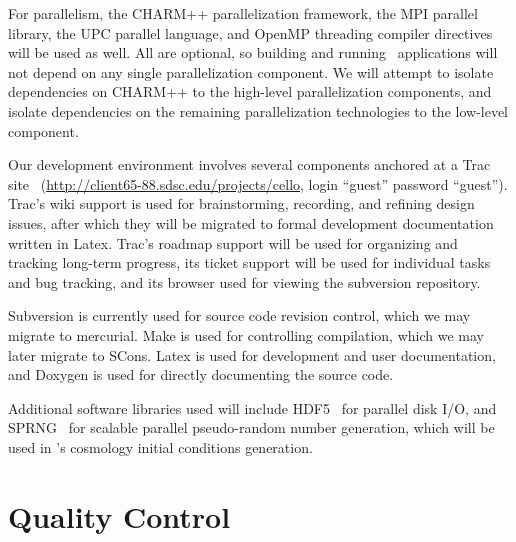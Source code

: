 \documentclass[10pt]{article}
\begin{document}
For parallelism, the CHARM++ parallelization framework, the MPI
parallel library, the UPC parallel language, and OpenMP threading
compiler directives will be used as well.  All are optional, so
building and running \cello\ applications will not depend on any
single parallelization component.  We will attempt to isolate
dependencies on CHARM++ to the high-level parallelization components,
and isolate dependencies on the remaining parallelization technologies
to the low-level  component.

Our development environment involves several components anchored at a
Trac site~\cite{wwwtrac}
(\url{http://client65-88.sdsc.edu/projects/cello}, login ``guest''
password ``guest'').  Trac's wiki support is used for brainstorming,
recording, and refining design issues, after which they will be
migrated to formal development documentation written in Latex.  Trac's
roadmap support will be used for organizing and tracking long-term
progress, its ticket support will be used for individual tasks and bug
tracking, and its browser used for viewing the subversion repository.

Subversion is currently used for source code revision control, which
we may migrate to mercurial.  Make is used for controlling
compilation, which we may later migrate to SCons.  Latex is used for
development and user documentation, and Doxygen is used for directly
documenting the source code.

Additional software libraries used will include HDF5~\cite{hdf5} for
parallel disk I/O, and SPRNG~\cite{wwwsprng} for scalable parallel
pseudo-random number generation, which will be used in \enzoii's
cosmology initial conditions generation.

\section{Quality Control} \label{s:testing}
\end{document}
